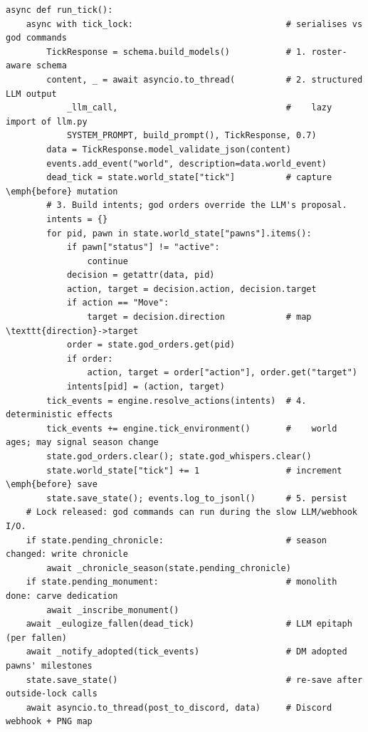 \documentclass[10pt,a4paper]{article}
\begin{document}
\begin{lstlisting}[style=python, caption={Tick Orchestration (core.py, condensed). lock $\to$ schema $\to$ LLM $\to$ override $\to$ resolve $\to$ environment $\to$ tick++ $\to$ save; season-change detection, eulogy, adoption DMs, the Architect review, and embed all run outside the lock}, label={lst:tick}]
async def run_tick():
    async with tick_lock:                              # serialises vs god commands
        TickResponse = schema.build_models()           # 1. roster-aware schema
        content, _ = await asyncio.to_thread(          # 2. structured LLM output
            _llm_call,                                 #    lazy import of llm.py
            SYSTEM_PROMPT, build_prompt(), TickResponse, 0.7)
        data = TickResponse.model_validate_json(content)
        events.add_event("world", description=data.world_event)
        dead_tick = state.world_state["tick"]          # capture \emph{before} mutation
        # 3. Build intents; god orders override the LLM's proposal.
        intents = {}
        for pid, pawn in state.world_state["pawns"].items():
            if pawn["status"] != "active":
                continue
            decision = getattr(data, pid)
            action, target = decision.action, decision.target
            if action == "Move":
                target = decision.direction            # map \texttt{direction}->target
            order = state.god_orders.get(pid)
            if order:
                action, target = order["action"], order.get("target")
            intents[pid] = (action, target)
        tick_events = engine.resolve_actions(intents)  # 4. deterministic effects
        tick_events += engine.tick_environment()       #    world ages; may signal season change
        state.god_orders.clear(); state.god_whispers.clear()
        state.world_state["tick"] += 1                 # increment \emph{before} save
        state.save_state(); events.log_to_jsonl()      # 5. persist
    # Lock released: god commands can run during the slow LLM/webhook I/O.
    if state.pending_chronicle:                        # season changed: write chronicle
        await _chronicle_season(state.pending_chronicle)
    if state.pending_monument:                         # monolith done: carve dedication
        await _inscribe_monument()
    await _eulogize_fallen(dead_tick)                  # LLM epitaph (per fallen)
    await _notify_adopted(tick_events)                 # DM adopted pawns' milestones
    state.save_state()                                 # re-save after outside-lock calls
    await asyncio.to_thread(post_to_discord, data)     # Discord webhook + PNG map
\end{lstlisting}
\end{document}
